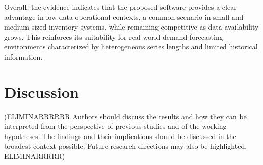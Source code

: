 \documentclass[journal,article,submit,pdftex,moreauthors]{Definitions/mdpi}
\begin{document}
Overall, the evidence indicates that the proposed software provides a clear advantage in low-data operational contexts, a common scenario in small and medium-sized inventory systems, while remaining competitive as data availability grows. This reinforces its suitability for real-world demand forecasting environments characterized by heterogeneous series lengths and limited historical information.

\section{Discussion}

(ELIMINARRRRRR
Authors should discuss the results and how they can be interpreted from the perspective of previous studies and of the working hypotheses. The findings and their implications should be discussed in the broadest context possible. Future research directions may also be highlighted.
ELIMINARRRRR)
\end{document}
